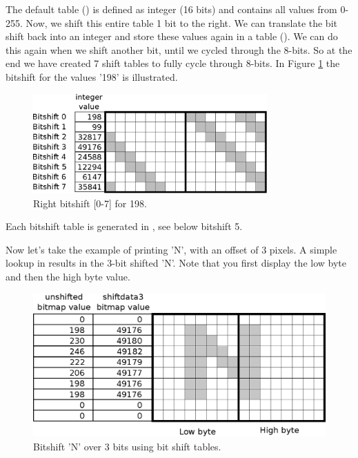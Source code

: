 \documentclass[book.tex]{subfiles}
\begin{document}
The default table () is defined as integer (16 bits) and contains all values from 0-255. Now, we shift this entire table 1 bit to the right. We can translate the bit shift back into an integer and store these values again in a table (). We can do this again when we shift another bit, until we cycled through the 8-bits. So at the end we have created 7 shift tables to fully cycle through 8-bits. In Figure \ref{fig:shiftttable} the bitshift for the values '198' is illustrated.
\begin{figure}[H]
\centering
 \includegraphics[width=0.8\textwidth]{imgs/drawings/shift_tables.eps}
 \caption{Right bitshift [0-7] for 198.}
 \label{fig:shiftttable}
 \end{figure}
 \par

Each bitshift table is generated in , see below bitshift 5. \\
\begin{minipage}{\textwidth}
  
\end{minipage}
\label{wallclip_array}
\par
 

Now let's take the example of printing 'N', with an offset of 3 pixels. A simple lookup in  results in the 3-bit shifted 'N'. Note that you first display the low byte and then the high byte value. \\
\begin{figure}[H]
\centering
 \includegraphics[width=\textwidth]{imgs/drawings/text_bitshift_N.eps}
 \caption{Bitshift 'N' over 3 bits using bit shift tables.}
 \label{fig:text_bitshift_N}
 \end{figure}
 \par
\end{document}

